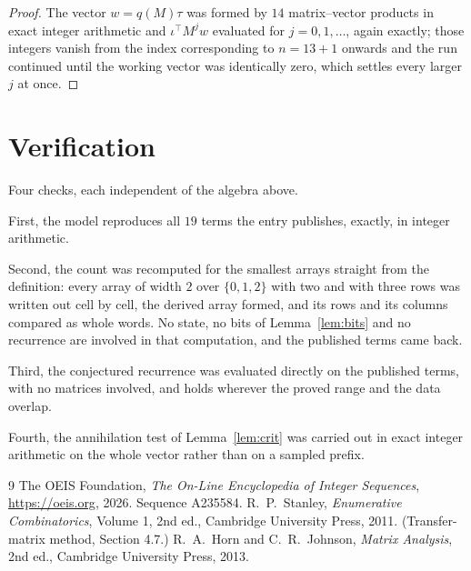 \documentclass[11pt,a4paper]{article}
\theoremstyle{plain}
\theoremstyle{definition}
\begin{document}
\begin{proof}
The vector $w=q(M)\tau$ was formed by $14$ matrix--vector products in exact integer
arithmetic and $\iota^{\!\top}M^{j}w$ evaluated for $j=0,1,\dots$, again exactly; those
integers vanish from the index corresponding to $n=13+1$ onwards and the run continued
until the working vector was identically zero, which settles every larger $j$ at once.
\end{proof}

\section{Verification}

Four checks, each independent of the algebra above.

First, the model reproduces all $19$ terms the entry publishes, exactly, in integer
arithmetic.

Second, the count was recomputed for the smallest arrays straight from the definition: every
array of width $2$ over $\{0,1,2\}$ with two and with three rows was written out cell by cell,
the derived array formed, and its rows and its columns compared as whole words. No state, no
bits of Lemma~\ref{lem:bits} and no recurrence are involved in that computation, and the
published terms came back.

Third, the conjectured recurrence was evaluated directly on the published terms, with no
matrices involved, and holds wherever the proved range and the data overlap.

Fourth, the annihilation test of Lemma~\ref{lem:crit} was carried out in exact integer
arithmetic on the whole vector rather than on a sampled prefix.

\begin{thebibliography}{9}
 The OEIS Foundation, \emph{The On-Line Encyclopedia of Integer
Sequences}, \url{https://oeis.org}, 2026. Sequence A235584.
 R.~P.~Stanley, \emph{Enumerative Combinatorics}, Volume 1, 2nd ed.,
Cambridge University Press, 2011. (Transfer-matrix method, Section 4.7.)
 R.~A.~Horn and C.~R.~Johnson, \emph{Matrix Analysis}, 2nd ed., Cambridge
University Press, 2013.
\end{thebibliography}
\end{document}
